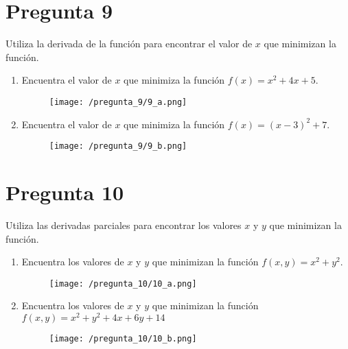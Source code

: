 \documentclass[]{article}
\begin{document}
\section*{Pregunta 9}
Utiliza la derivada de la función para encontrar el valor de $x$ que minimizan la función.

\begin{enumerate}[label=(\alph*)]
	\item Encuentra el valor de $x$ que minimiza la función $f(x)=x^2+4x+5$.
	\begin{figure}[H]
		\texttt{[image: /pregunta\_9/9\_a.png]}
	\end{figure}
	\item Encuentra el valor de $x$ que minimiza la función $f(x)=(x-3)^2+7$.
	\begin{figure}[H]
		\texttt{[image: /pregunta\_9/9\_b.png]}
	\end{figure}
\end{enumerate} 

\section*{Pregunta 10}
Utiliza las derivadas parciales para encontrar los valores $x$ y $y$ que minimizan la función.

\begin{enumerate}[label=(\alph*)]
	\item Encuentra los valores de $x$ y $y$ que minimizan la función $f(x,y)=x^2+y^2$.
	\begin{figure}[H]
		\texttt{[image: /pregunta\_10/10\_a.png]}
	\end{figure}
	\item Encuentra los valores de $x$ y $y$ que minimizan la función $f(x,y)=x^2+y^2+4x+6y+14$
	\begin{figure}[H]
		\texttt{[image: /pregunta\_10/10\_b.png]}
	\end{figure}
\end{enumerate}
\end{document}
